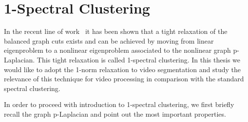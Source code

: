\section{1-Spectral Clustering}
\label{sec:ch2_1spectclus}
In the recent line of work~\cite{Buhler09,Hein10,HeinS11} it has been shown that a tight relaxation of the balanced graph cuts exists and can be achieved by moving from linear eigenproblem to a nonlinear eigenproblem associated 
to the nonlinear graph p-Laplacian. This tight relaxation is called 1-spectral clustering. 
In this thesis we would like to adopt the 1-norm relaxation to video segmentation and study the relevance of this technique for video processing in comparison with the standard spectral clustering. 

In order to proceed with introduction to 1-spectral clustering, we first briefly recall the graph p-Laplacian and point out the most important properties.
